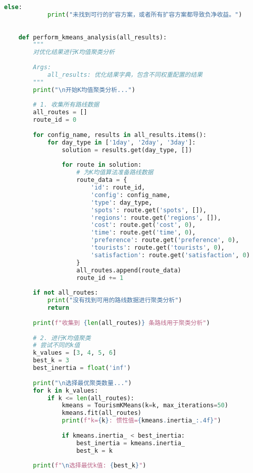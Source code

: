 \begin{lstlisting}[language=Python]
        else:
            print("未找到可行的扩容方案，或者所有扩容方案都导致负净收益。")
    
    
    def perform_kmeans_analysis(all_results):
        """
        对优化结果进行K均值聚类分析
        
        Args:
            all_results: 优化结果字典，包含不同权重配置的结果
        """
        print("\n开始K均值聚类分析...")
        
        # 1. 收集所有路线数据
        all_routes = []
        route_id = 0
        
        for config_name, results in all_results.items():
            for day_type in ['1day', '2day', '3day']:
                solution = results.get(day_type, [])
                
                for route in solution:
                    # 为K均值算法准备路线数据
                    route_data = {
                        'id': route_id,
                        'config': config_name,
                        'type': day_type,
                        'spots': route.get('spots', []),
                        'regions': route.get('regions', []),
                        'cost': route.get('cost', 0),
                        'time': route.get('time', 0),
                        'preference': route.get('preference', 0),
                        'tourists': route.get('tourists', 0),
                        'satisfaction': route.get('satisfaction', 0)
                    }
                    all_routes.append(route_data)
                    route_id += 1
        
        if not all_routes:
            print("没有找到可用的路线数据进行聚类分析")
            return
        
        print(f"收集到 {len(all_routes)} 条路线用于聚类分析")
        
        # 2. 进行K均值聚类
        # 尝试不同的k值
        k_values = [3, 4, 5, 6]
        best_k = 3
        best_inertia = float('inf')
        
        print("\n选择最优聚类数量...")
        for k in k_values:
            if k <= len(all_routes):
                kmeans = TourismKMeans(k=k, max_iterations=50)
                kmeans.fit(all_routes)
                print(f"k={k}: 惯性值={kmeans.inertia_:.4f}")
                
                if kmeans.inertia_ < best_inertia:
                    best_inertia = kmeans.inertia_
                    best_k = k
        
        print(f"\n选择最优k值: {best_k}")
        

\end{lstlisting}
